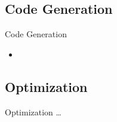 \subsection{Code Generation}
\begin{frame}{Code Generation}
    \begin{itemize}
        \item 
    \end{itemize}
\end{frame}

\subsection{Optimization}
\begin{frame}{Optimization}
    \dots
\end{frame}

